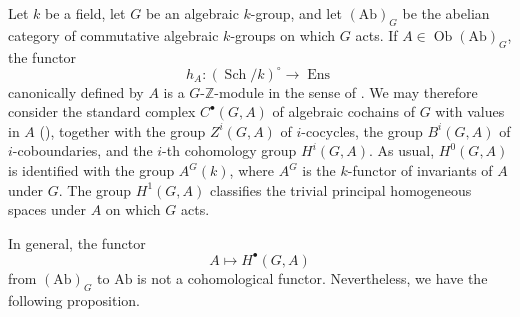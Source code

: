

Let \(k\) be a field, let \(G\) be an algebraic \(k\)-group, and
let \((\mathrm{Ab})_G\) be the abelian category of commutative
algebraic \(k\)-groups on which \(G\) acts.  If
\(A\in\operatorname{Ob}(\mathrm{Ab})_G\), the functor
\[
  h_A:(\operatorname{Sch}/k)^\circ\longrightarrow
      \operatorname{Ens}
\]
canonically defined by \(A\) is a \(G\)-\(\mathbb Z\)-module in
the sense of .  We may therefore consider the
standard complex \(C^\bullet(G,A)\) of algebraic cochains of \(G\)
with values in \(A\) (), together with the group
\(Z^i(G,A)\) of \(i\)-cocycles, the group \(B^i(G,A)\) of
\(i\)-coboundaries, and the \(i\)-th cohomology group
\(H^i(G,A)\).  As usual, \(H^0(G,A)\) is identified with the
group \(A^G(k)\), where \(A^G\) is the \(k\)-functor of invariants
of \(A\) under \(G\).  The group \(H^1(G,A)\) classifies the
trivial principal homogeneous spaces under \(A\) on which \(G\)
acts.

In general, the functor
\[
  A\longmapsto H^\bullet(G,A)
\]
from \((\mathrm{Ab})_G\) to \(\mathrm{Ab}\) is not a
cohomological functor.  Nevertheless, we have the following
proposition.


